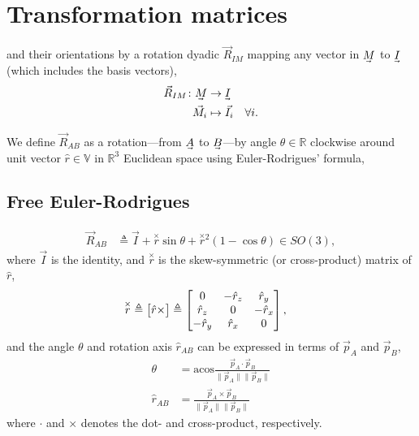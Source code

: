 \section{Transformation matrices}\label{IV_transformation_matrices} 

and their orientations by a rotation dyadic $\vec{R}_{IM}$ mapping any vector in $\uvec{M}$ to $\uvec{I}$ (which includes the basis vectors),
%
\begin{align}
\vec{R}_{IM}\colon \uvec{M} &\to \uvec{I}\label{eq_rotation_dyadic}\\
\vec{M}_i &\mapsto \vec{I}_i \quad \forall i. \nonumber
\end{align}

We define $\vec{R}_{AB}$ as a rotation---from $\uvec{A}$ to $\uvec{B}$---by angle $\theta\in\mathbb{R}$ clockwise around unit vector $\hat{r}\in\mathbb{V}$ in $\mathbb{R}^3$ Euclidean space using Euler-Rodrigues' formula,

\subsection{Free Euler-Rodrigues}\label{IV_sec:free_euler_rodrigues}
%
\begin{align}\label{eq:M}
\vec{R}_{AB}
&\triangleq %
 \vec{I} + \overset{\times}{r}\sin\theta + \overset{\times}{r}{}^2(1-\cos\theta) \in SO(3),
\end{align}
%
where $\vec{I}$ is the identity, and $\overset{\times}{r}$ is the skew-symmetric (or cross-product) matrix of $\hat{r}$,
%
\begin{align}
\overset{\times}{r}
&\triangleq \bmat{\hat{r}\times} \triangleq \bmat{
0 & -\hat{r}_z & \hat{r}_y \\
\hat{r}_z & 0 & -\hat{r}_x \\
-\hat{r}_y & \hat{r}_x & 0
},
\end{align}
%
and the angle $\theta$ and rotation axis $\hat{r}_{AB}$ can be expressed in terms of $\vec{p}_A$ and $\vec{p}_{B}$,
%
\begin{align}
\theta
&= \mathrm{acos}\frac{\vec{p}_{A}\cdot\vec{p}_{B}}{\lVert\vec{p}_{A}\rVert\lVert\vec{p}_{B}\rVert} \\
\hat{r}_{AB} &=  \frac{\vec{p}_{A}\times\vec{p}_{B}}{\lVert\vec{p}_{A}\rVert\lVert\vec{p}_{B}\rVert}
\end{align}
%
where $\cdot$ and $\times$ denotes the dot- and cross-product, respectively.

